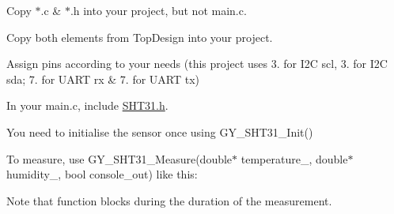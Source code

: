 \begin{DoxyItemize}
\item Copy $\ast$.c \& $\ast$.h into your project, but not main.\+c.
\item Copy both elements from Top\+Design into your project.
\item Assign pins according to your needs (this project uses 3. for I2C scl, 3. for I2C sda; 7. for U\+A\+RT rx \& 7. for U\+A\+RT tx)
\item In your main.\+c, include \mbox{\hyperlink{_s_h_t31_8h_source}{S\+H\+T31.\+h}}.
\item You need to initialise the sensor once using {\ttfamily G\+Y\+\_\+\+S\+H\+T31\+\_\+\+Init()}
\end{DoxyItemize}

To measure, use {\ttfamily G\+Y\+\_\+\+S\+H\+T31\+\_\+\+Measure(double$\ast$ temperature\+\_\+, double$\ast$ humidity\+\_\+, bool console\+\_\+out)} like this\+: 
\begin{DoxyCode}{0}
\DoxyCodeLine{}
\end{DoxyCode}


Note that function blocks during the duration of the measurement.

